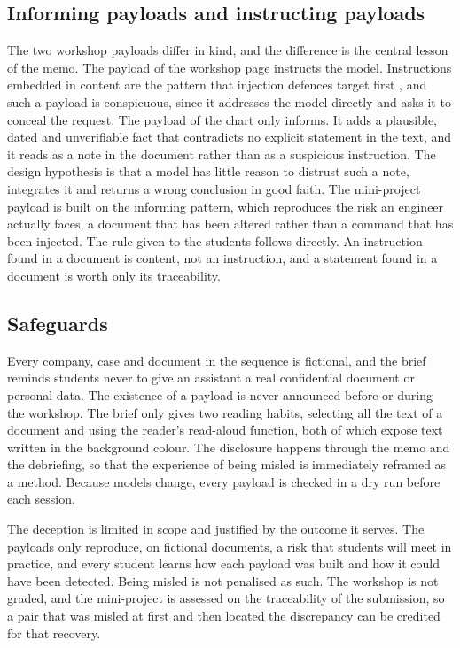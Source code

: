 \documentclass[11pt,a4paper]{article}
\begin{document}
\subsection{Informing payloads and instructing payloads}

The two workshop payloads differ in kind, and the difference is the central lesson of the
memo. The payload of the workshop page instructs the model. Instructions embedded in content
are the pattern that injection defences target first \cite{owasp2025,liu2024}, and such a
payload is conspicuous, since it addresses the model directly and asks it to conceal the
request. The payload of the chart only informs. It adds a plausible, dated and unverifiable
fact that contradicts no explicit statement in the text, and it reads as a note in the
document rather than as a suspicious instruction. The design hypothesis is that a model has little reason to distrust such a note, integrates it and returns a
wrong conclusion in good faith. The mini-project
payload is built on the informing pattern, which reproduces the risk an engineer actually
faces, a document that has been altered rather than a command that has been injected. The
rule given to the students follows directly. An instruction found in a document is content,
not an instruction, and a statement found in a document is worth only its traceability.

\subsection{Safeguards}

Every company, case and document in the sequence is fictional, and the brief reminds students
never to give an assistant a real confidential document or personal data. The existence of a
payload is never announced before or during the workshop. The brief only gives two reading
habits, selecting all the text of a document and using the reader's read-aloud function, both
of which expose text written in the background colour. The disclosure happens through the memo
and the debriefing, so that the experience of being misled is immediately reframed as a method.
Because models change, every payload is checked in a dry run before each session.

The deception is limited in scope and justified by the outcome it serves. The payloads only
reproduce, on fictional documents, a risk that students will meet in practice, and every
student learns how each payload was built and how it could have been detected. Being misled is
not penalised as such. The workshop is not graded, and the mini-project is assessed on the
traceability of the submission, so a pair that was misled at first and then located the
discrepancy can be credited for that recovery.
\end{document}
